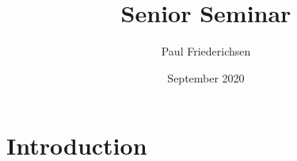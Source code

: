 \documentclass{article}
\title{Senior Seminar}
\author{Paul Friederichsen}
\date{September 2020}
\begin{document}
\maketitle

\section{Introduction}
\end{document}
